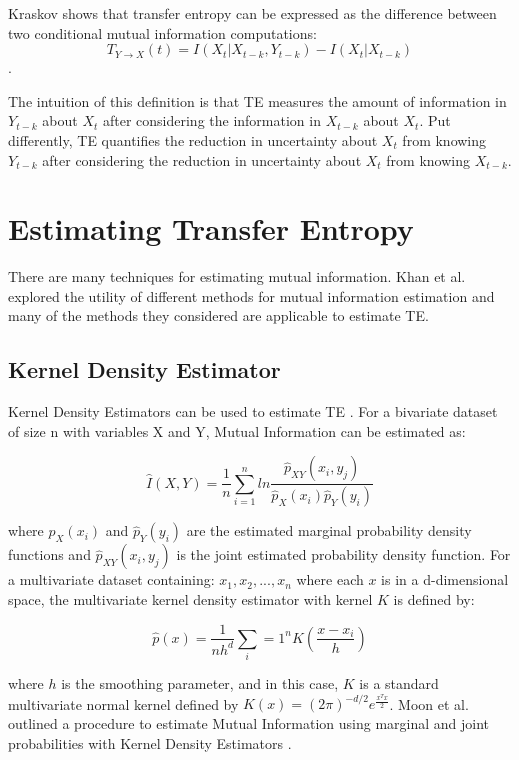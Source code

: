 \documentclass[conference]{IEEEtran}
\begin{document}
Kraskov \cite{kraskovEstimator} shows that transfer entropy can be expressed as the difference between two conditional mutual information computations: \begin{equation} T_{Y \rightarrow X}(t) = I(X_t | X_{t-k}, Y_{t-k}) -  I(X_t | X_{t-k})  \end{equation} .

The intuition of this definition is that TE measures the amount of information in \(Y_{t-k}\) about \(X_t\) after  considering the information in \(X_{t-k}\) about \(X_t\). Put differently, TE quantifies the reduction in uncertainty about \(X_t\) from knowing \(Y_{t-k}\) after considering the reduction in uncertainty about \(X_t\) from knowing \(X_{t-k}\).

\section{Estimating Transfer Entropy}

There are many techniques for estimating mutual information. Khan et al. explored the utility of different methods for mutual information estimation \cite{EstimatingTE} and many of the methods they considered are applicable to estimate TE.

\subsection{Kernel Density Estimator}
Kernel Density Estimators can be used to estimate TE \cite{KDE}. For a bivariate dataset of size n with variables X and Y, Mutual Information can be estimated as:

\begin{equation}\hat{I}(X,Y) = \frac{1}{n} \sum_{i=1}^n ln \frac{\hat{p}_{XY}(x_i, y_j)  } {\hat{p}_X(x_i) \hat{p}_Y(y_i)}  \end{equation}

\noindent where \(\hat{p}_X(x_i)\) and \( \hat{p}_Y(y_i)\) are the estimated marginal probability density functions and  \(\hat{p}_{XY}(x_i, y_j)\) is the joint estimated probability density function. For a multivariate dataset containing: \(x_1, x_2, ..., x_n\) where each \(x\) is in a d-dimensional space, the multivariate kernel density estimator with kernel \(K\) is defined by:

\begin{equation}\hat{p}(x) = \frac{1}{nh^d} \sum_i=1^n K(\frac{x-x_i}{h}  )\end{equation}

\noindent where \(h\) is the smoothing parameter, and in this case, \(K\) is a standard multivariate normal kernel defined by \(K(x)=(2\pi)^{-d/2} e^{\frac{x^Tx}{2} } \). Moon et al. outlined a procedure to estimate Mutual Information using marginal and joint probabilities with Kernel Density Estimators \cite{KDE}.
\end{document}
